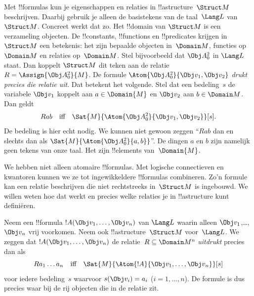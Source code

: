 \documentclass[../../../include/open-logic-section]{subfiles}
\begin{document}


\begin{explain}
Met !!{formula}s kun je eigenschappen en relaties in
!!a{structure}~$\Struct M$ beschrijven. Daarbij gebruik je alleen de
basistekens van de taal~$\Lang L$ van~$\Struct M$. Concreet werkt dat
zo. Het !!{domain} van $\Struct M$ is een verzameling objecten. De
!!{constant}s, !!{function}s en !!{predicate}s krijgen in~$\Struct M$
een betekenis: het zijn bepaalde objecten in~$\Domain M$, functies
op~$\Domain M$ en relaties op~$\Domain M$. Stel bijvoorbeeld dat
$\Obj A^2_0$ in $\Lang L$ staat. Dan koppelt $\Struct M$ dit teken aan
de relatie~$R = \Assign{{\Obj A^2_0}}{M}$. De formule
$\Atom{\Obj A^2_0}{\Obj v_1, \Obj v_2}$ \emph{drukt precies die
relatie uit}. Dat betekent het volgende. Stel dat een bedeling~$s$
de variabele $\Obj v_1$ koppelt aan $a \in \Domain{M}$ en $\Obj v_2$
aan $b \in \Domain M$. Dan geldt
\[
Rab \text{\quad iff\quad} \Sat{M}{\Atom{\Obj A^2_0}{\Obj v_1, \Obj v_2}}[s].
\]
De bedeling is hier echt nodig. We kunnen niet gewoon zeggen ``$Rab$
dan en slechts dan als $\Sat{M}{\Atom{\Obj A^2_0}{a, b}}$''. De dingen
$a$ en $b$ zijn namelijk geen tekens van onze taal. Het zijn
!!{element}s van~$\Domain{M}$.

We hebben niet alleen atomaire !!{formula}s. Met logische connectieven
en kwantoren kunnen we ze tot ingewikkeldere !!{formula}s combineren.
Zo'n formule kan een relatie beschrijven die niet rechtstreeks
in~$\Struct M$ is ingebouwd. We willen weten hoe dat werkt en precies
welke relaties je in !!a{structure} kunt definiëren.
\end{explain}

\begin{defn}
Neem een !!{formula} $!A(\Obj v_1,\dots, \Obj v_n)$ van $\Lang L$
waarin alleen $\Obj v_1$,\dots, $\Obj v_n$ vrij voorkomen. Neem ook
!!a{structure}~$\Struct M$ voor~$\Lang L$. We zeggen dat
$!A(\Obj v_1,\dots, \Obj v_n)$ de relatie~$R \subseteq
\Domain M^n$ \emph{uitdrukt} precies dan als
\[
Ra_1\dots a_n \text{\quad iff\quad} \Sat{M}{\Atom{!A}{\Obj
    v_1,\dots, \Obj v_n}}[s]
\]
voor iedere bedeling~$s$ waarvoor $s(\Obj v_i) = a_i$ ($i = 1,
\dots, n$). De formule is dus precies waar bij de rij objecten die in
de relatie zit.
\end{defn}
\end{document}
